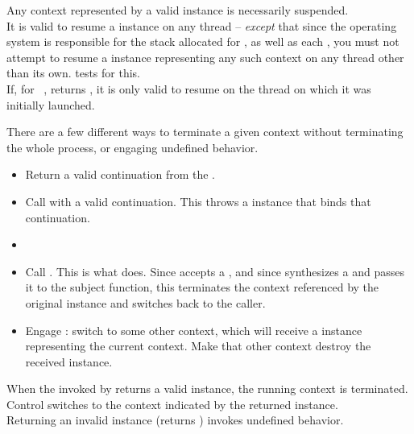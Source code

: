 Any context represented by a valid \cont instance is necessarily suspended.\\

It is valid to resume a \cont instance on any thread -- \emph{except} that
since the operating system is responsible for the stack allocated for \main,
as well as each , you must not attempt to resume a \cont
instance representing any such context on any thread other
than its own. \anythread tests for this.\\

If, for \cont\ ,  returns , it is
only valid to resume  on the thread on which it was initially
launched.


There are a few different ways to terminate a given context without
terminating the whole process, or engaging undefined behavior.

\begin{itemize}
\item Return a valid continuation from the \entryfn.
\item Call \unwindcont with a valid continuation. This throws a \unwindex
instance that binds that continuation.
\item {}
\item
Call .
This is what \dtor does. Since \unwindcont accepts a \cont, and
since \resumewith synthesizes a \cont and passes it to the subject function,
this terminates the context referenced by the original \cont instance and
switches back to the caller.
\item Engage \dtor: switch to some other context, which will
receive a \cont instance representing the current context. Make that other
context destroy the received \cont instance.
\end{itemize}

When the \entryfn invoked by \callcc returns a valid \cont instance,
the running context is terminated. Control switches to the context
indicated by the returned \cont instance.\\

Returning an invalid \cont instance (\opbool returns ) invokes
undefined behavior.\\

